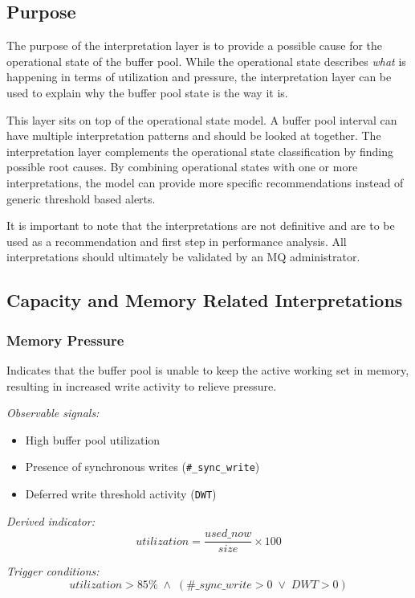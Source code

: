 \subsection{Purpose}

The purpose of the interpretation layer is to provide a possible cause for the operational state of the buffer pool. While the operational state describes \textit{what} is happening in terms of utilization and pressure, the interpretation layer can be used to explain why the buffer pool state is the way it is.

This layer sits on top of the operational state model. A buffer pool interval can have multiple interpretation patterns and should be looked at together.
The interpretation layer complements the operational state classification by finding possible root causes. By combining operational states with one or more interpretations, the model can provide more specific recommendations instead of generic threshold based alerts.

It is important to note that the interpretations are not definitive and are to be used as a recommendation and first step in performance analysis. All interpretations should ultimately be validated by an MQ administrator.

\subsection{Capacity and Memory Related Interpretations}

\subsubsection{Memory Pressure}

Indicates that the buffer pool is unable to keep the active working set in memory, resulting in increased write activity to relieve pressure.

\textit{Observable signals:}
\begin{itemize}
    \item High buffer pool utilization
    \item Presence of synchronous writes (\texttt{\#\_sync\_write})
    \item Deferred write threshold activity (\texttt{DWT})
\end{itemize}

\textit{Derived indicator:}
\[
utilization = \frac{used\_now}{size} \times 100
\]

\textit{Trigger conditions:}
\[
utilization > 85\% \;\land\; (\#\_sync\_write > 0 \;\lor\; DWT > 0)
\]

